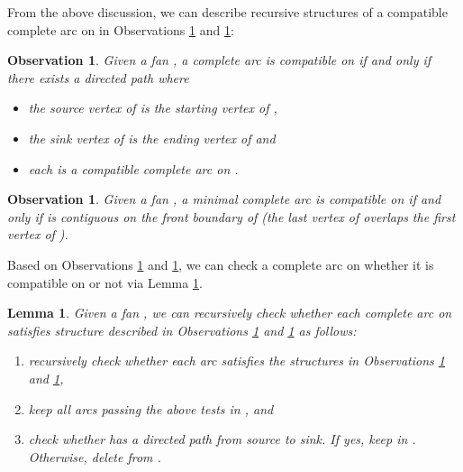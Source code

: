 \documentclass[11pt]{article}
\newtheorem{lemma}[figure]{Lemma}
\newtheorem{observation}[figure]{Observation}
\begin{document}
From the above discussion, we can describe recursive structures of a compatible
complete arc on  in Observations \ref{obs:complete-edge} and \ref{obs:minimal-complete-edge}:





\begin{observation}\label{obs:complete-edge}
Given a fan , a complete arc
 is compatible on  if and only if
there exists a directed path 
where
\begin{itemize}
\item the source vertex of  is the starting vertex of ,
\item the sink vertex of  is the ending vertex of  and
\item each  is a compatible complete arc on .
\end{itemize}
\end{observation}

\begin{observation}\label{obs:minimal-complete-edge}
Given a fan ,
a minimal complete arc  is compatible on 
if and only if
 is contiguous on the front boundary  of 
(the last vertex of  overlaps the first vertex of ).
\end{observation}


Based on Observations \ref{obs:complete-edge} and \ref{obs:minimal-complete-edge},
we can check a complete arc  on  whether it is compatible
on  or not via Lemma \ref{lemma:complete-edge}.

\begin{lemma}\label{lemma:complete-edge}
Given a fan ,
we can recursively check whether each complete arc  on 
satisfies structure described in Observations \ref{obs:complete-edge} and \ref{obs:minimal-complete-edge} as follows:
\begin{enumerate}
\item recursively check whether each arc  satisfies the structures in Observations \ref{obs:complete-edge}
and \ref{obs:minimal-complete-edge},
\item keep all arcs passing the above tests in , and
\item check whether  has a directed path from source to sink. If yes, keep  in .
Otherwise, delete  from .
\end{enumerate}
\end{lemma}
\end{document}
